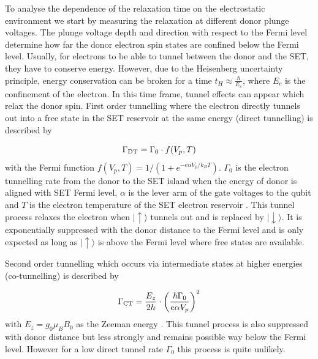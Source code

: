\documentclass[%
 reprint,
 amsmath,amssymb,
 aps,
]{revtex4-1}
\newcommand {\ket} [1] {|{ #1 \rangle}}
\begin{document}
To analyse the dependence of the relaxation time on the electrostatic environment we start by measuring the relaxation at different donor plunge voltages. The plunge voltage depth and direction with respect to the Fermi level determine how far the donor electron spin states are confined below the Fermi level. 
Usually, for electrons to be able to tunnel between the donor and the SET, they have to conserve energy. However, due to the Heisenberg uncertainty principle, energy conservation can be broken for a time $t_H\approx\frac{\hbar}{E_c}$, where $E_c$ is the confinement of the electron. In this time frame, tunnel effects can appear which relax the donor spin. First order tunnelling where the electron directly tunnels out into a free state in the SET reservoir at the same energy (direct tunnelling) is described by 

\begin{equation}\label{eq:directt}
\Gamma_{\rm DT} = \Gamma_0\cdot f(V_p, T)
\end{equation}
with the Fermi function $f(V_p,T)=1/\left(1+e^{-{e\alpha V_p}/{k_B T}}\right)$. $\Gamma_0$ is the electron tunnelling rate from the donor to the SET island when the energy of donor is aligned with SET Fermi level, $\alpha$ is the lever arm of the gate voltages to the qubit and $T$ is the electron temperature of the SET electron reservoir \cite{Golovach2004, MacLean2007}. This tunnel process relaxes the electron when $\ket{\uparrow}$ tunnels out and is replaced by $\ket{\downarrow}$. It is exponentially suppressed with the donor distance to the Fermi level and is only expected as long as $\ket{\uparrow}$ is above the Fermi level where free states are available. 

Second order tunnelling which occurs via intermediate states at higher energies (co-tunnelling) is described by 

\begin{equation}\label{eq:cot}
\Gamma_{\rm CT} = \frac{E_z}{2h}\cdot\left(\frac{\hbar\Gamma_0}{e\alpha V_p}\right)^2
\end{equation}
with $E_z=g_0\mu_B B_0$ as the Zeeman energy \cite{Qassemi2009, Lai2011, Otsuka2017}. This tunnel process is also suppressed with donor distance but less strongly and remains possible way below the Fermi level. However for a low direct tunnel rate $\Gamma_0$ this process is quite unlikely. 
\end{document}
